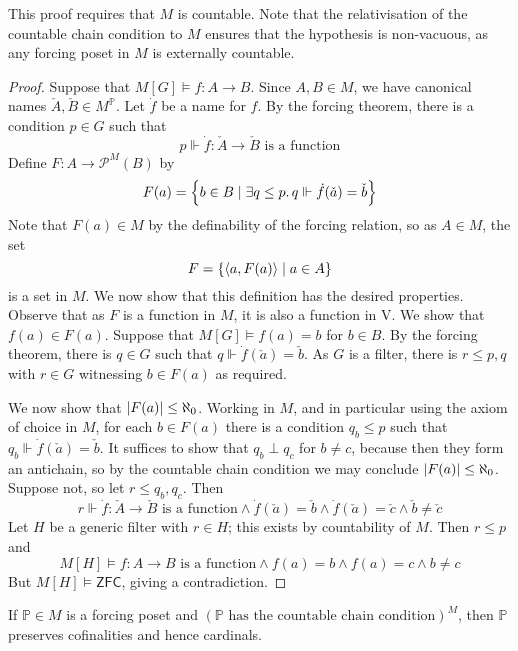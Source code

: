 This proof requires that \( M \) is countable.
Note that the relativisation of the countable chain condition to \( M \) ensures that the hypothesis is non-vacuous, as any forcing poset in \( M \) is externally countable.
\begin{proof}
    Suppose that \( M[G] \vDash f : A \to B \).
    Since \( A, B \in M \), we have canonical names \( \check A, \check B \in M^{\mathbb P} \).
    Let \( \dot f \) be a name for \( f \).
    By the forcing theorem, there is a condition \( p \in G \) such that
    \[ p \Vdash \dot f : \check A \to \check B \text{ is a function} \]
    Define \( F : A \to \mathcal P^M(B) \) by
    \[ F(a) = \qty{b \in B \mid \exists q \leq p.\, q \Vdash \dot f(\check a) = \check b} \]
    Note that \( F(a) \in M \) by the definability of the forcing relation, so as \( A \in M \), the set
    \[ F = \qty{\langle a, F(a) \rangle \mid a \in A} \]
    is a set in \( M \).
    We now show that this definition has the desired properties.
    Observe that as \( F \) is a function in \( M \), it is also a function in \( \mathrm{V} \).
    We show that \( f(a) \in F(a) \).
    Suppose that \( M[G] \vDash f(a) = b \) for \( b \in B \).
    By the forcing theorem, there is \( q \in G \) such that \( q \Vdash \dot f(\check a) = \check b \).
    As \( G \) is a filter, there is \( r \leq p, q \) with \( r \in G \) witnessing \( b \in F(a) \) as required.

    We now show that \( \abs{F(a)} \leq \aleph_0 \).
    Working in \( M \), and in particular using the axiom of choice in \( M \), for each \( b \in F(a) \) there is a condition \( q_b \leq p \) such that \( q_b \Vdash \dot f(\check a) = \check b \).
    It suffices to show that \( q_b \perp q_c \) for \( b \neq c \), because then they form an antichain, so by the countable chain condition we may conclude \( \abs{F(a)} \leq \aleph_0 \).
    Suppose not, so let \( r \leq q_b, q_c \).
    Then
    \[ r \Vdash \dot f : \check A \to \check B \text{ is a function} \wedge \dot f(\check a) = \check b \wedge \dot f(\check a) = \check c \wedge \check b \neq \check c \]
    Let \( H \) be a generic filter with \( r \in H \); this exists by countability of \( M \).
    Then \( r \leq p \) and
    \[ M[H] \vDash f : A \to B \text{ is a function} \wedge f(a) = b \wedge f(a) = c \wedge b \neq c \]
    But \( M[H] \vDash \mathsf{ZFC} \), giving a contradiction.
\end{proof}
\begin{theorem}
    If \( \mathbb P \in M \) is a forcing poset and \( (\mathbb P \text{ has the countable chain condition})^M \), then \( \mathbb P \) preserves cofinalities and hence cardinals.
\end{theorem}
